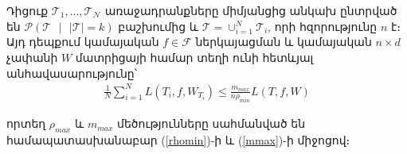 \documentclass[12pt]{article}
\begin{document}
\begin{lemma}
\label{bs_inequality}
Դիցուք $\mathcal{T}_1, ..., \mathcal{T_N}$ առաջադրանքները միմյանցից անկախ ընտրված են $\mathcal{P}(\mathcal{T} \text{ } |\text{ }  |\mathcal{T}| = k )$ բաշխումից և $\mathcal{T} = \cup_{i=1}^N{\mathcal{T}_i}$, որի հզորությունը $n$ է։ Այդ դեպքում կամայական $f \in \mathcal{F}$ ներկայացման և  կամայական $n \times d$ չափանի $W$  մատրիցայի համար տեղի ունի հետևյալ անհավասարությունը՝
\begin{align}
\label{mean_task_ineq}
\frac{1}{N}\sum_{i=1}^N L(T_i, f, W_{T_i}) \leq  \frac{m_{max}}{n\rho_{min}}  L(T, f, W) 
\end{align}

\noindent որտեղ $\rho_{max}$ և $m_{max}$ մեծությունները սահմանված են համապատասխանաբար (\ref{rhomin})-ի և (\ref{mmax})-ի միջոցով։
\end{lemma}
\end{document}
